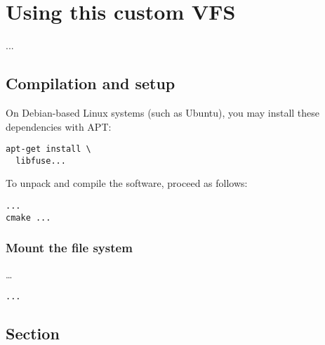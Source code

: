 \chapter{Using this custom VFS}

...

\section*{Compilation and setup}

On Debian-based Linux systems (such as Ubuntu), you may install these dependencies with APT:

\begin{Verbatim}
apt-get install \
  libfuse...
\end{Verbatim}

To unpack and compile the software, proceed as follows:

\begin{Verbatim}
...
cmake ...
\end{Verbatim}

\subsection*{Mount the file system}

\ldots

\begin{Verbatim}
...
\end{Verbatim}

\section*{Section}